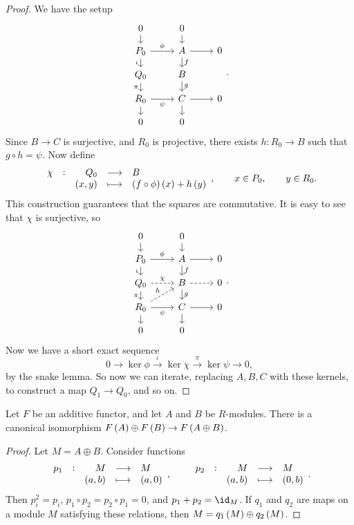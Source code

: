\begin{proof}
We have the setup
$$
\begin{tikzcd}[row sep=small]
0 \arrow{d} & 0 \arrow{d} & \\
P_0 \arrow{r}{\phi} \arrow{d}[swap]{\iota} & A \arrow{r} \arrow{d}{f} & 0 \\
Q_0 \arrow{d}[swap]{\pi} & B \arrow{d}{g} & \\
R_0 \arrow{r}[swap]{\psi} \arrow{d} & C \arrow{r} \arrow{d} & 0 \\
0 & 0 &
\end{tikzcd}.
$$
Since $ B \to C $ is surjective, and $ R_0 $ is projective, there exists $ h : R_0 \to B $ such that $ g \circ h = \psi $. Now define
$$ \function[\chi]{Q_0}{B}{\br{x, y}}{\br{f \circ \phi}\br{x} + h\br{y}}, \qquad x \in P_0, \qquad y \in R_0. $$
This construction guarantees that the squares are commutative. It is easy to see that $ \chi $ is surjective, so
$$
\begin{tikzcd}[row sep=small]
0 \arrow{d} & 0 \arrow{d} & \\
P_0 \arrow{r}{\phi} \arrow{d}[swap]{\iota} & A \arrow{r} \arrow{d}{f} & 0 \\
Q_0 \arrow[dashed]{r}{\chi} \arrow{d}[swap]{\pi} & B \arrow[dashed]{r} \arrow{d}{g} & 0 \\
R_0 \arrow[dashed]{ur}{h} \arrow{r}[swap]{\psi} \arrow{d} & C \arrow{r} \arrow{d} & 0 \\
0 & 0 &
\end{tikzcd}.
$$
Now we have a short exact sequence
$$ 0 \to \ker \phi \xrightarrow{\iota} \ker \chi \xrightarrow{\pi} \ker \psi \to 0, $$
by the snake lemma. So now we can iterate, replacing $ A, B, C $ with these kernels, to construct a map $ Q_1 \to Q_0 $, and so on.
\end{proof}

\pagebreak

\begin{proposition}
Let $ F $ be an additive functor, and let $ A $ and $ B $ be $ R $-modules. There is a canonical isomorphism $ F\br{A} \oplus F\br{B} \to F\br{A \oplus B} $.
\end{proposition}

\begin{proof}
Let $ M = A \oplus B $. Consider functions
$$ \function[p_1]{M}{M}{\br{a, b}}{\br{a, 0}}, \qquad \function[p_2]{M}{M}{\br{a, b}}{\br{0, b}}. $$
Then $ p_i^2 = p_i $, $ p_1 \circ p_2 = p_2 \circ p_1 = 0 $, and $ p_1 + p_2 = \id_M $. If $ q_1 $ and $ q_2 $ are maps on a module $ M $ satisfying these relations, then $ M = q_1\br{M} \oplus q_2\br{M} $.
\end{proof}

